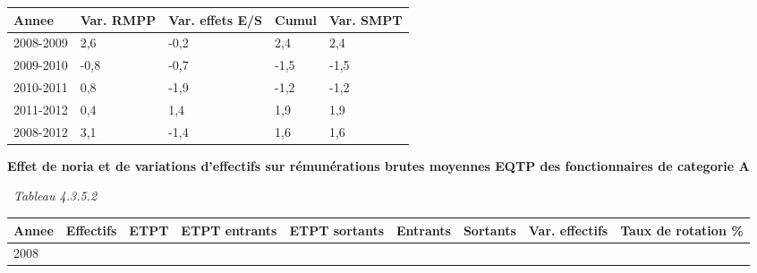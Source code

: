 \begin{longtable}[]{@{}lllll@{}}
\toprule
Annee & Var. RMPP & Var. effets E/S & Cumul & Var. SMPT\tabularnewline
\midrule
\endhead
2008-2009 & 2,6 & -0,2 & 2,4 & 2,4\tabularnewline
2009-2010 & -0,8 & -0,7 & -1,5 & -1,5\tabularnewline
2010-2011 & 0,8 & -1,9 & -1,2 & -1,2\tabularnewline
2011-2012 & 0,4 & 1,4 & 1,9 & 1,9\tabularnewline
2008-2012 & 3,1 & -1,4 & 1,6 & 1,6\tabularnewline
\bottomrule
\end{longtable}

\textbf{Effet de noria et de variations d'effectifs sur rémunérations
brutes moyennes EQTP des fonctionnaires de categorie A}

~\emph{Tableau 4.3.5.2}

\begin{longtable}[]{@{}lllllllll@{}}
\toprule
\begin{minipage}[b]{0.05\columnwidth}\raggedright
Annee\strut
\end{minipage} & \begin{minipage}[b]{0.08\columnwidth}\raggedright
Effectifs\strut
\end{minipage} & \begin{minipage}[b]{0.05\columnwidth}\raggedright
ETPT\strut
\end{minipage} & \begin{minipage}[b]{0.10\columnwidth}\raggedright
ETPT entrants\strut
\end{minipage} & \begin{minipage}[b]{0.10\columnwidth}\raggedright
ETPT sortants\strut
\end{minipage} & \begin{minipage}[b]{0.07\columnwidth}\raggedright
Entrants\strut
\end{minipage} & \begin{minipage}[b]{0.07\columnwidth}\raggedright
Sortants\strut
\end{minipage} & \begin{minipage}[b]{0.11\columnwidth}\raggedright
Var. effectifs\strut
\end{minipage} & \begin{minipage}[b]{0.14\columnwidth}\raggedright
Taux de rotation \%\strut
\end{minipage}\tabularnewline
\midrule
\endhead
\begin{minipage}[t]{0.05\columnwidth}\raggedright
2008\strut
\end{minipage} & \begin{minipage}[t]{0.08\columnwidth}\raggedright

\end{minipage}
\end{longtable}
